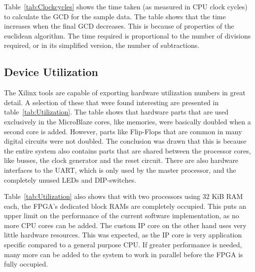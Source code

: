 \documentclass[11pt]{article}
\begin{document}
Table~\ref{tab:Clockcycles} shows the time taken (as measured in CPU clock cycles) to calculate the GCD for the sample data\cite{assignments}. The table shows that the time increases when the final GCD decreases. This is because of properties of the euclidean algorithm. The time required is proportional to the number of divisions required, or in its simplified version, the number of subtractions.

\subsection{Device Utilization}
The Xilinx tools are capable of exporting hardware utilization numbers in great detail. A selection of these that were found interesting are presented in table~\ref{tab:Utilization}. The table shows that hardware parts that are used exclusively in the MicroBlaze cores, like memories, were basically doubled when a second core is added. However, parts like Flip-Flops that are common in many digital circuits were not doubled. The conclusion was drawn that this is because the entire system also contains parts that are shared between the processor cores, like busses, the clock generator and the reset circuit. There are also hardware interfaces to the UART, which is only used by the master processor, and the completely unused LEDs and DIP-switches.

Table~\ref{tab:Utilization} also shows that with two processors using 32 KiB RAM each, the FPGA's dedicated block RAMs are completely occupied. This puts an upper limit on the performance of the current software implementation, as no more CPU cores can be added. The custom IP core on the other hand uses very little hardware resources. This was expected, as the IP core is very application specific compared to a general purpose CPU. If greater performance is needed, many more can be added to the system to work in parallel before the FPGA is fully occupied.
\end{document}
